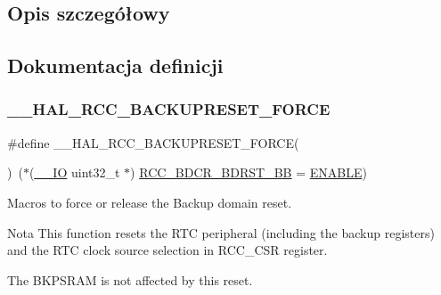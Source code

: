 \subsection{Opis szczegółowy}


\subsection{Dokumentacja definicji}
\mbox{\label{group___r_c_c___internal___r_t_c___clock___configuration_ga3bf7da608ff985873ca8e248fb1dc4f0}} 
\subsubsection{\texorpdfstring{\+\_\+\+\_\+\+H\+A\+L\+\_\+\+R\+C\+C\+\_\+\+B\+A\+C\+K\+U\+P\+R\+E\+S\+E\+T\+\_\+\+F\+O\+R\+CE}{\_\_HAL\_RCC\_BACKUPRESET\_FORCE}}
{\footnotesize\ttfamily \#define \+\_\+\+\_\+\+H\+A\+L\+\_\+\+R\+C\+C\+\_\+\+B\+A\+C\+K\+U\+P\+R\+E\+S\+E\+T\+\_\+\+F\+O\+R\+CE(\begin{DoxyParamCaption}{ }\end{DoxyParamCaption})~($\ast$(\hyperlink{core__sc300_8h_aec43007d9998a0a0e01faede4133d6be}{\+\_\+\+\_\+\+IO} uint32\+\_\+t $\ast$) \hyperlink{group___r_c_c___bit_address___alias_region_ga5e5805d3c5b9ad3ebc13e030e5fdd86c}{R\+C\+C\+\_\+\+B\+D\+C\+R\+\_\+\+B\+D\+R\+S\+T\+\_\+\+BB} = \hyperlink{group___exported__types_ggac9a7e9a35d2513ec15c3b537aaa4fba1a7d46875fa3ebd2c34d2756950eda83bf}{E\+N\+A\+B\+LE})}



Macros to force or release the Backup domain reset. 

\begin{DoxyNote}{Nota}
This function resets the R\+TC peripheral (including the backup registers) and the R\+TC clock source selection in R\+C\+C\+\_\+\+C\+SR register. 

The B\+K\+P\+S\+R\+AM is not affected by this reset. 
\end{DoxyNote}


